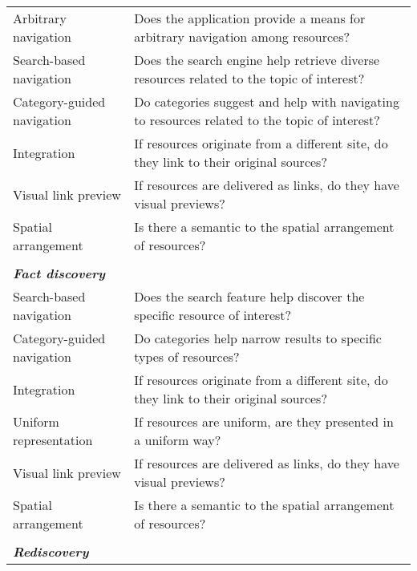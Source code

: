 \documentclass{casconpaper}
\begin{document}
{\begin{table*}[htbp]
\begin{tabular}{|p{0.30\linewidth}|p{0.70\linewidth}|}
Arbitrary navigation         & Does the application provide a means for arbitrary navigation among resources?                              \\
Search-based navigation      & Does the search engine help retrieve diverse resources related to the topic of interest?               \\
Category-guided navigation & Do categories suggest and help with navigating to resources related to the topic of interest?           \\
Integration                  & If resources originate from a different site, do they link to their original sources?                   \\
Visual link preview               & If resources are delivered as links, do they have visual previews?                                                                        \\
Spatial arrangement          & Is there a semantic to the spatial arrangement of resources?                                                    \\
&\\
\emph{\textbf{Fact discovery}}                &                                                                                                           \\
Search-based navigation      & Does the search feature help discover the specific resource of interest?                                  \\
Category-guided navigation & Do categories help narrow results to specific types of resources?                                   \\
Integration                  & If resources originate from a different site, do they link to their original sources?                   \\
Uniform representation       & If resources are uniform, are they presented in a uniform way? \\
Visual link preview               & If resources are delivered as links, do they have visual previews?                                                                        \\
Spatial arrangement          & Is there a semantic to the spatial arrangement of resources?                                                    \\
&\\
\emph{\textbf{Rediscovery}}                     &                                                                                                           \\

\end{tabular}
\end{table*}}
\end{document}
